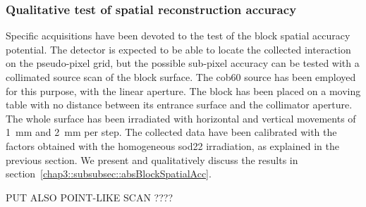 \subsubsection{Qualitative test of spatial reconstruction accuracy}\label{chap3::subsubsec::test_spatial_scan}
Specific acquisitions have been devoted to the test of the block spatial accuracy potential. The detector is expected to be able to locate the collected interaction on the pseudo-pixel grid, but the possible sub-pixel accuracy can be tested with a collimated source scan of the block surface. The \gls{cob60} source has been employed for this purpose, with the linear aperture. The block has been placed on a moving table with no distance between its entrance surface and the collimator aperture. The whole surface has been irradiated with horizontal and vertical movements of 1~mm and 2~mm per step. The collected data have been calibrated with the factors obtained with the homogeneous \gls{sod22} irradiation, as explained in the previous section. We present and qualitatively discuss the results in section~\ref{chap3::subsubsec::absBlockSpatialAcc}. 

PUT ALSO POINT-LIKE SCAN ????

